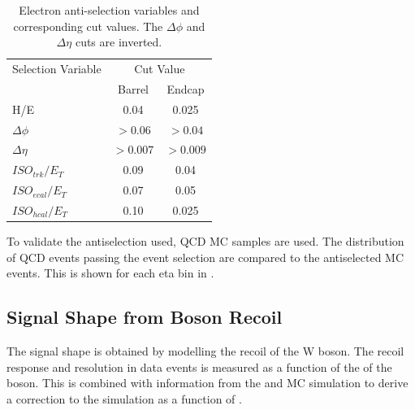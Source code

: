 \begin{table}[htbp]
  \begin{center}
    \leavevmode
    \begin{tabular}{lcc} 
    \toprule
      Selection Variable & \multicolumn{2}{c}{Cut Value}\\
                         & Barrel & Endcap\\
    \midrule
        H/E & 0.04 & 0.025 \\
        $\Delta\phi$ & $>0.06$  & $>0.04$ \\
        $\Delta\eta$ & $>0.007$ & $>0.009$\\
        $ISO_{trk} / E_T $ & 0.09 & 0.04 \\
        $ISO_{ecal}/ E_T$  & 0.07 & 0.05 \\
        $ISO_{hcal}/ E_T$  & 0.10 & 0.025\\ 
    \bottomrule
    \end{tabular}
    \caption{\label{tab:antisel}Electron anti-selection variables and
corresponding cut values. The $\Delta\phi$ and $\Delta\eta$ cuts are inverted.}
  \end{center}
\end{table}

To validate the antiselection used, \ac{QCD} \ac{MC} samples are used. The
distribution of \ac{QCD} events passing the event selection are compared to the
antiselected MC events. This is shown for each eta bin in
.

\subsection{Signal \ETm Shape from Boson Recoil}
\label{sec:recoil}
The signal \ETm shape is obtained by modelling the recoil of the W boson. 
The recoil response and resolution in \HepProcess{\PZ\to\Plepton\Plepton} data
events is measured as a function of the \pT of the boson. This is combined with
information from the \PW and \PZ \ac{MC} simulation to derive a correction to
the simulation \ETm as a function of \PW \pT.

